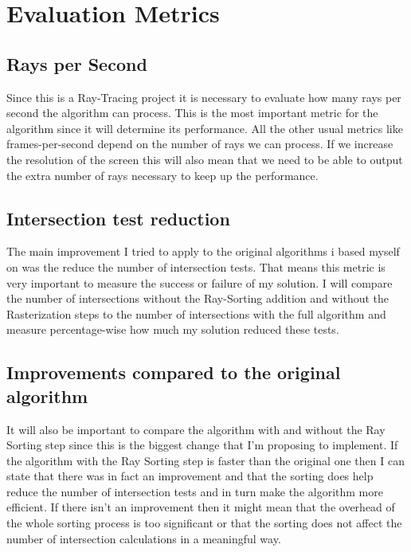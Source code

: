 \documentclass{llncs}
\begin{document}
%
\section{Evaluation Metrics}
%

%
\subsection{Rays per Second}
%

Since this is a Ray-Tracing project it is necessary to evaluate how many rays per second the algorithm can process. This is the most important metric for the algorithm since it will determine its performance. All the other usual metrics like frames-per-second depend on the number of rays we can process. If we increase the resolution of the screen this will also mean that we need to be able to output the extra number of rays necessary to keep up the performance.

%
\subsection{Intersection test reduction}
%

The main improvement I tried to apply to the original algorithms i based myself on was the reduce the number of intersection tests. That means this metric is very important to measure the success or failure of my solution. I will compare the number of intersections without the Ray-Sorting addition and without the Rasterization steps to the number of intersections with the full algorithm and measure percentage-wise how much my solution reduced these tests.

%
\subsection{Improvements compared to the original algorithm}

It will also be important to compare the algorithm with and without the Ray Sorting step since this is the biggest change that I'm proposing to implement. If the algorithm with the Ray Sorting step is faster than the original one then I can state that there was in fact an improvement and that the sorting does help reduce the number of intersection tests and in turn make the algorithm more efficient. If there isn't an improvement then it might mean that the overhead of the whole sorting process is too significant or that the sorting does not affect the number of intersection calculations in a meaningful way.
%
\end{document}
